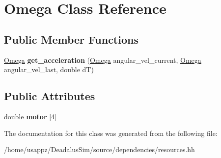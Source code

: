 \hypertarget{classOmega}{\section{\-Omega \-Class \-Reference}
\label{classOmega}
}
\subsection*{\-Public \-Member \-Functions}
\begin{DoxyCompactItemize}
\item 
\hypertarget{classOmega_a05d1fc46a2e088a7c4df5ee3cedb39b2}{\hyperlink{classOmega}{\-Omega} {\bfseries get\-\_\-acceleration} (\hyperlink{classOmega}{\-Omega} angular\-\_\-vel\-\_\-current, \hyperlink{classOmega}{\-Omega} angular\-\_\-vel\-\_\-last, double d\-T)}\label{classOmega_a05d1fc46a2e088a7c4df5ee3cedb39b2}

\end{DoxyCompactItemize}
\subsection*{\-Public \-Attributes}
\begin{DoxyCompactItemize}
\item 
\hypertarget{classOmega_aa1c7d60641030db02904e31e5b06d13e}{double {\bfseries motor} \mbox{[}4\mbox{]}}\label{classOmega_aa1c7d60641030db02904e31e5b06d13e}

\end{DoxyCompactItemize}


\-The documentation for this class was generated from the following file\-:\begin{DoxyCompactItemize}
\item 
/home/usappz/\-Deadalus\-Sim/source/dependencies/resources.\-hh\end{DoxyCompactItemize}
